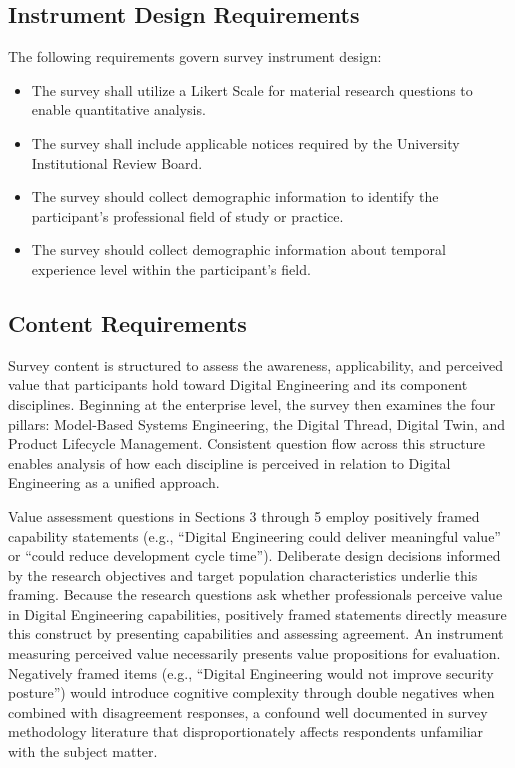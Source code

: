 \subsection{Instrument Design Requirements}

The following requirements govern survey instrument design:

\begin{itemize}
  \item The survey shall utilize a Likert Scale for material research questions to enable quantitative analysis.
  \item The survey shall include applicable notices required by the University Institutional Review Board.
  \item The survey should collect demographic information to identify the participant's professional field of study or practice.
  \item The survey should collect demographic information about temporal experience level within the participant's field.
\end{itemize}

\subsection{Content Requirements}

Survey content is structured to assess the awareness, applicability, and perceived value that participants hold toward Digital Engineering and its component disciplines. Beginning at the enterprise level, the survey then examines the four pillars: Model-Based Systems Engineering, the Digital Thread, Digital Twin, and Product Lifecycle Management. Consistent question flow across this structure enables analysis of how each discipline is perceived in relation to Digital Engineering as a unified approach.

Value assessment questions in Sections 3 through 5 employ positively framed capability statements (e.g., ``Digital Engineering could deliver meaningful value'' or ``could reduce development cycle time''). Deliberate design decisions informed by the research objectives and target population characteristics underlie this framing. Because the research questions ask whether professionals perceive value in Digital Engineering capabilities, positively framed statements directly measure this construct by presenting capabilities and assessing agreement. An instrument measuring perceived value necessarily presents value propositions for evaluation. Negatively framed items (e.g., ``Digital Engineering would not improve security posture'') would introduce cognitive complexity through double negatives when combined with disagreement responses, a confound well documented in survey methodology literature that disproportionately affects respondents unfamiliar with the subject matter.

